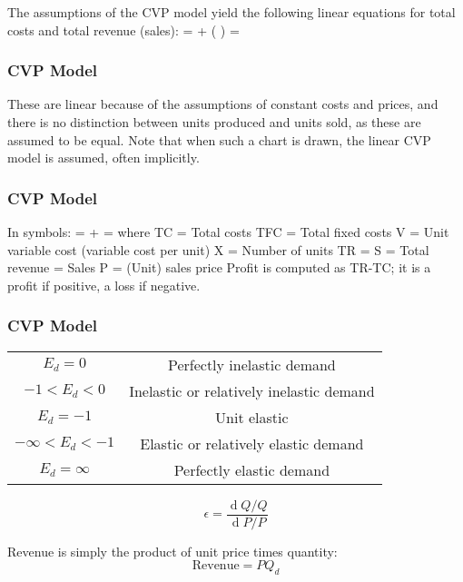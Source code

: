 \documentclass{beamer}
\begin{document}
\begin{frame}
The assumptions of the CVP model yield the following linear equations for total costs and total revenue (sales):
 =  + ( \times {})
 =  \times {}
\end{frame}

\begin{frame}
\frametitle{CVP Model}
These are linear because of the assumptions of constant costs and prices, and there is no distinction between units produced and units sold, as these are assumed to be equal. Note that when such a chart is drawn, the linear CVP model is assumed, often implicitly.
\end{frame}

\begin{frame}
\frametitle{CVP Model}
In symbols:
 =  +  \times {}
 =  \times {}
where
TC = Total costs
TFC = Total fixed costs
V = Unit variable cost (variable cost per unit)
X = Number of units
TR = S = Total revenue = Sales
P = (Unit) sales price
Profit is computed as TR-TC; it is a profit if positive, a loss if negative.
\end{frame}

\begin{frame}
\frametitle{CVP Model}

\begin{tabular}{|c|c|}
$E_d = 0$ & Perfectly inelastic demand \\
$- 1 < E_d < 0 $ &Inelastic or relatively inelastic demand\\
$E_d=  - 1 $& Unit elastic\\
$ - \infty < E_d < - 1$ & 
Elastic or relatively elastic demand \\
$E_d = \infty $&
Perfectly elastic demand \\
\end{tabular} 
\end{frame}


\begin{frame}
\[ \epsilon = \frac{\operatorname d Q/Q}{\operatorname d P/P} \]



 Revenue is simply the product of unit price times quantity:
  \[﻿ \mbox{Revenue} = PQ_d﻿\]
\end{frame}
\end{document}
